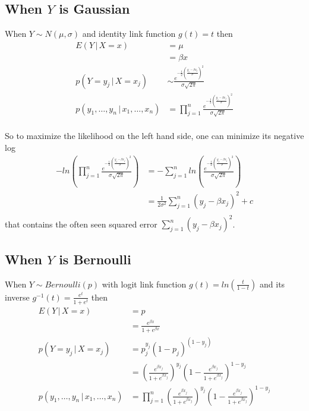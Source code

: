 \documentclass[12pt]{amsart}
\theoremstyle{definition}
\begin{document}
\subsection{When $Y$ is Gaussian} When $Y \sim N(\mu, \sigma)$ and identity link function $g(t) = t$ then
\begin{align*}
E(Y \,|\, X = x) & = \mu \\
 & = \beta x \\
p(Y = y_j \,|\, X = x_j) & \sim \frac{e^{- \frac{1}{2} \left( \frac{y_j - \beta x_j}{\sigma} \right)^2}}{\sigma \sqrt{2 \pi}} \\
p(y_1, \dots , y_n \,|\, x_1, \dots , x_n) & = \prod\limits_{j = 1}^n \frac{e^{- \frac{1}{2} \left( \frac{y_j - \beta x_j}{\sigma} \right)^2}}{\sigma \sqrt{2 \pi}} \\
\end{align*}

So to maximize the likelihood on the left hand side, one can minimize its negative log
\begin{align*}
- ln \left( \prod\limits_{j = 1}^n \frac{e^{- \frac{1}{2} \left( \frac{y_j - \beta x_j}{\sigma} \right)^2}}{\sigma \sqrt{2 \pi}} \right) & = - \sum\limits_{j = 1}^n ln \left( \frac{e^{- \frac{1}{2} \left( \frac{y_j - \beta x_j}{\sigma} \right)^2}}{\sigma \sqrt{2 \pi}} \right) \\
 & = \frac{1}{2 \sigma^2} \sum\limits_{j = 1}^n (y_j - \beta x_j)^2 + c \\
\end{align*}
that contains the often seen squared error $\sum\limits_{j = 1}^n (y_j - \beta x_j)^2$.
\subsection{When $Y$ is Bernoulli} When $Y \sim Bernoulli(p)$ with logit link function $g(t) = ln \left(\frac{t}{1 - t} \right)$ and its inverse $g^{-1}(t) = \frac{e^t}{1 + e^t}$ then
\begin{align*}
E(Y \,|\, X = x) & = p \\
 & = \frac{e^{\beta x}}{1 + e^{\beta x}} \\
p(Y = y_j \,|\, X = x_j) & = p_j^{y_j} (1 - p_j)^{(1 - y_j)} \\
 & = \left( \frac{e^{\beta x_j}}{1 + e^{\beta x_j}} \right)^{y_j} \left( 1 - \frac{e^{\beta x_j}}{1 + e^{\beta x_j}} \right)^{1 - y_j} \\
p(y_1, \dots , y_n \,|\, x_1, \dots , x_n) & = \prod\limits_{j = 1}^n  \left( \frac{e^{\beta x_j}}{1 + e^{\beta x_j}} \right)^{y_j} \left( 1 - \frac{e^{\beta x_j}}{1 + e^{\beta x_j}} \right)^{1 - y_j} \\
\end{align*}
\end{document}

